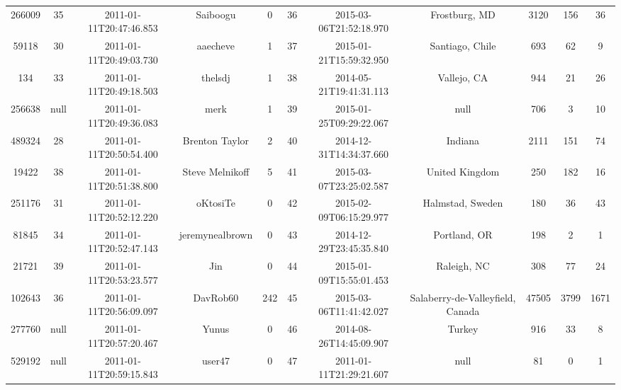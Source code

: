 \documentclass[12pt,a4paper,twoside,openright,titlepage,final]{article}
\begin{document}
\begin{enumerate}
\begin{table}[htbp!]
{\begin{tabular}{@{}ccccccccccc@{}}
			266009    & 35   & 2011-01-11T20:47:46.853 & Saiboogu              & 0         & 36    & 2015-03-06T21:52:18.970 & Frostburg, MD                    & 3120       & 156     & 36    \\
			59118     & 30   & 2011-01-11T20:49:03.730 & aaecheve              & 1         & 37    & 2015-01-21T15:59:32.950 & Santiago, Chile                  & 693        & 62      & 9     \\
			134       & 33   & 2011-01-11T20:49:18.503 & thelsdj               & 1         & 38    & 2014-05-21T19:41:31.113 & Vallejo, CA                      & 944        & 21      & 26    \\
			256638    & null & 2011-01-11T20:49:36.083 & merk                  & 1         & 39    & 2015-01-25T09:29:22.067 & null                             & 706        & 3       & 10    \\
			489324    & 28   & 2011-01-11T20:50:54.400 & Brenton Taylor        & 2         & 40    & 2014-12-31T14:34:37.660 & Indiana                          & 2111       & 151     & 74    \\
			19422     & 38   & 2011-01-11T20:51:38.800 & Steve Melnikoff       & 5         & 41    & 2015-03-07T23:25:02.587 & United Kingdom                   & 250        & 182     & 16    \\
			251176    & 31   & 2011-01-11T20:52:12.220 & oKtosiTe              & 0         & 42    & 2015-02-09T06:15:29.977 & Halmstad, Sweden                 & 180        & 36      & 43    \\
			81845     & 34   & 2011-01-11T20:52:47.143 & jeremynealbrown       & 0         & 43    & 2014-12-29T23:45:35.840 & Portland, OR                     & 198        & 2       & 1     \\
			21721     & 39   & 2011-01-11T20:53:23.577 & Jin                   & 0         & 44    & 2015-01-09T15:55:01.453 & Raleigh, NC                      & 308        & 77      & 24    \\
			102643    & 36   & 2011-01-11T20:56:09.097 & DavRob60              & 242       & 45    & 2015-03-06T11:41:42.027 & Salaberry-de-Valleyfield, Canada & 47505      & 3799    & 1671  \\
			277760    & null & 2011-01-11T20:57:20.467 & Yunus                 & 0         & 46    & 2014-08-26T14:45:09.907 & Turkey                           & 916        & 33      & 8     \\
			529192    & null & 2011-01-11T20:59:15.843 & user47                & 0         & 47    & 2011-01-11T21:29:21.607 & null                             & 81         & 0       & 1     \\

\end{tabular}}
\end{table}
\end{enumerate}
\end{document}
